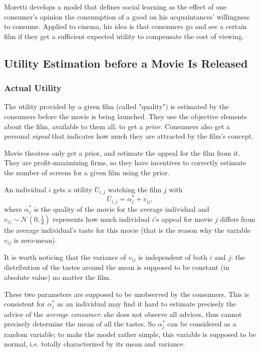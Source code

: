 			Moretti develops a model that defines social learning as the effect of one consumer's opinion the consumption of a good on his acquaintances' willingness to consume.
			Applied to cinema, his idea is that consumers go and see a certain film if they get a sufficient expected utility to compensate the cost of viewing.
	\subsection{Utility Estimation before a Movie Is Released}	
	\subsubsection{Actual Utility}
			The utility provided by a given film (called "quality") is estimated by the consumers before the movie is being launched. They use the objective elements about the film, available to them all, to get a \textit{prior}. Consumers also get a personal \textit{signal} that indicates how much they are attracted by the film's concept.

			Movie theatres only get a prior, and estimate the appeal for the film from it. They are profit-maximizing firms, so they have incentives to correctly estimate the number of screens for a given film using the prior.

	An individual $i$ gets a utility $U_{i,j}$ watching the film $j$ with
	\begin{equation} \label{eq:1}
	U_{i,j}=\alpha_{j}^{*}+v_{i j},
	\end{equation}
	where $\alpha_{j}^{*}$ is the quality of the movie for the average individual and $v_{i j}\sim \mathcal{N}(0,\frac{1}{d})$ represents how much individual $i$'s appeal for movie $j$ differs from the average individual's taste for this movie (that is the reason why the variable $v_{i j}$ is zero-mean).

	It is worth noticing that the variance of $v_{i j}$ is independent of both $i$ and $j$: the distribution of the tastes around the mean is supposed to be constant (in absolute value) no matter the film.
	
	These two parameters are supposed to be unobserved by the consumers. This is consistent for $\alpha_{j}^{*}$ as an individual may find it hard to estimate precisely the advice of the \textit{average consumer}: she does not observe all advices, thus cannot precisely determine the mean of all the tastes. So $\alpha_{j}^{*}$ can be considered as a random variable; to make the model rather simple, this variable is supposed to be normal, i.e. totally characterized by its mean and variance.
	

